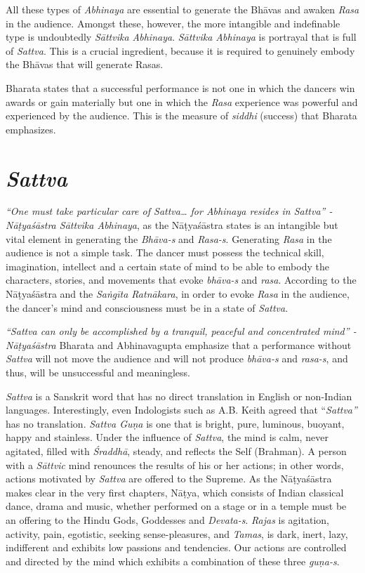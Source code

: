 All these types of \textit{Abhinaya} are essential to generate the Bhāvas and awaken \textit{Rasa} in the audience. Amongst these, however, the more intangible and indefinable type is undoubtedly \textit{Sāttvika Abhinaya}. \textit{Sāttvika Abhinaya} is portrayal that is full of \textit{Sattva}. This is a crucial ingredient, because it is required to genuinely embody the Bhāvas that will generate Rasas.

Bharata states that a successful performance is not one in which the dancers win awards or gain materially but one in which the \textit{Rasa} experience was powerful and experienced by the audience. This is the measure of \textit{siddhi} (success) that Bharata emphasizes.


\section*{\textit{Sattva}}

\textit{“One must take particular care of Sattva… for Abhinaya resides in Sattva” -Nāṭyaśāstra Sāttvika Abhinaya}, as the Nāṭyaśāstra states is an intangible but vital element in generating the \textit{Bhāva-s} and \textit{Rasa-s}. Generating \textit{Rasa} in the audience is not a simple task. The dancer must possess the technical skill, imagination, intellect and a certain state of mind to be able to embody the characters, stories, and movements that evoke \textit{bhāva-s} and \textit{rasa}. According to the Nāṭyaśāstra and the \textit{Saṅgīta Ratnākara}, in order to evoke \textit{Rasa} in the audience, the dancer’s mind and consciousness must be in a state of \textit{Sattva}.

\newpage

\textit{“Sattva can only be accomplished by a tranquil, peaceful and concentrated mind” -Nāṭyaśāstra} Bharata and Abhinavagupta emphasize that a performance without \textit{Sattva} will not move the audience and will not produce \textit{bhāva-s} and \textit{rasa-s}, and thus, will be unsuccessful and meaningless. 

\textit{Sattva} is a Sanskrit word that has no direct translation in English or non-Indian languages. Interestingly, even Indologists such as A.B. Keith agreed that “\textit{Sattva”} has no translation. \textit{Sattva Guṇa} is one that is bright, pure, luminous, buoyant, happy and stainless. Under the influence of \textit{Sattva}, the mind is calm, never agitated, filled with \textit{Śraddhā}, steady, and reflects the Self (Brahman). A person with a \textit{Sāttvic} mind renounces the results of his or her actions; in other words, actions motivated by \textit{Sattva} are offered to the Supreme. As the Nāṭyaśāstra makes clear in the very first chapters, Nāṭya, which consists of Indian classical dance, drama and music, whether performed on a stage or in a temple must be an offering to the Hindu Gods, Goddesses and \textit{Devata-s}. \textit{Rajas} is agitation, activity, pain, egotistic, seeking sense-pleasures, and \textit{Tamas}, is dark, inert, lazy, indifferent and exhibits low passions and tendencies. Our actions are controlled and directed by the mind which exhibits a combination of these three \textit{guṇa-s}.

